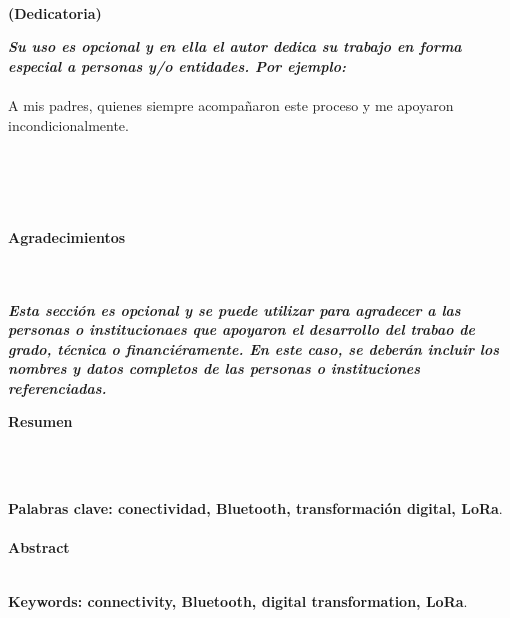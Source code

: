 

\newpage
\thispagestyle{empty} \textbf{}\normalsize
\\\\\\%
\textbf{(Dedicatoria)}\\[4.0cm]

\begin{flushright}
\begin{minipage}{8cm}
    \noindent
        \small
        \textit{\textbf{Su uso es opcional y en ella el autor dedica su trabajo en forma especial a personas y/o entidades. Por ejemplo:}}\\[1.0cm]\\
        A mis padres, quienes siempre acompañaron este proceso y me apoyaron incondicionalmente.\\[1.0cm]\\
\end{minipage}
\end{flushright}



\newpage
\thispagestyle{empty} \textbf{}\normalsize
\\\\\\%
\textbf{\LARGE Agradecimientos}
\\\\
\textit{\textbf{Esta sección es opcional y se puede utilizar para agradecer a las personas o institucionaes que apoyaron el desarrollo del trabao de grado, técnica o financiéramente. En este caso, se deberán incluir los nombres y datos completos de las personas o instituciones referenciadas.}}\\[1.0cm]

\lipsum[1-1]

\newpage{\pagestyle{empty}\cleardoublepage}


\newpage
\textbf{\LARGE Resumen}
\\\\
\lipsum[2-3]

\textbf{\small Palabras clave: conectividad, Bluetooth, transformación digital, LoRa}.\\\\

\textbf{\LARGE Abstract}\\\\
\lipsum[4-5]

\textbf{\small Keywords: connectivity, Bluetooth, digital transformation, LoRa}.
